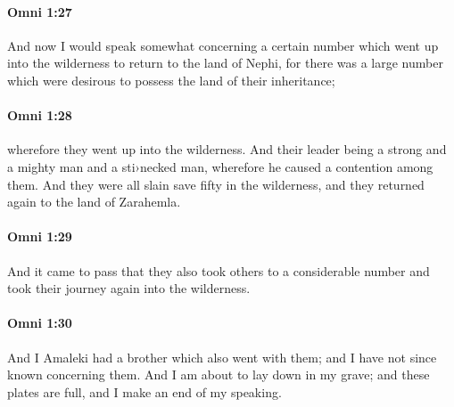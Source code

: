 		\paragraph{Omni 1:27} %
			\label{OMNI-1-27}

			And now I would speak somewhat concerning a certain number
			which went up into the wilderness to return to the land of Nephi,
			for there was a large number which were desirous
			to possess the land of their inheritance;

		\paragraph{Omni 1:28} %
			\label{OMNI-1-28}

			wherefore they went up into the wilderness.
			And their leader being a strong and a mighty man and a sti›necked man,
			wherefore he caused a contention among them.
			And they were all slain save fifty in the wilderness,
			and they returned again to the land of Zarahemla.

		\paragraph{Omni 1:29} %
			\label{OMNI-1-29}

			And it came to pass that they also took others to a considerable number
			and took their journey again into the wilderness.

		\paragraph{Omni 1:30} %
			\label{OMNI-1-30}

			And I Amaleki had a brother which also went with them;
			and I have not since known concerning them.
			And I am about to lay down in my grave;
			and these plates are full,
			and I make an end of my speaking.